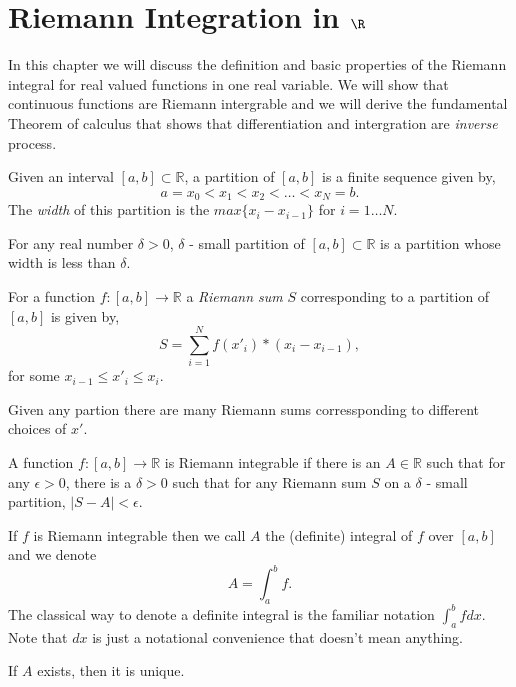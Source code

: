 \chapter{Riemann Integration in \texorpdfstring{$\R$}{}}
In this chapter we will discuss the definition and basic properties of the Riemann integral for real
valued functions in one real variable. We will show that continuous functions are Riemann
intergrable and we will derive the fundamental Theorem of calculus that shows that differentiation
and intergration are \emph{inverse} process.

\begin{Definition}
    Given an interval $\left[a,b\right] \subset \mathbb{R}$, a partition of $\left[a,b\right]$ is a
    finite sequence given by,
    \[ a = x_0 < x_1 < x_2 < \dots < x_N = b.\]
    The \emph{width} of this partition is the $max\lbrace x_i - x_{i-1}\rbrace$ for $i = 1 \dots N$.
\end{Definition}
\begin{Definition}
    For any real number $\delta > 0$, $\delta$ - small partition of $\left[a,b\right] \subset 
    \mathbb{R}$ is a partition whose width is less than $\delta$.
\end{Definition}
\begin{Definition}
    For a function $f : \left[a,b\right] \to \mathbb{R}$ a \emph{Riemann sum} $S$ corresponding to a
    partition of $\left[a,b\right]$ is given by,
    \[ S = \sum_{i = 1}^N f(x'{_i})*(x_i - x_{i-1}),\]
    for some $x_{i-1} \leq x'{_i} \leq x_i$.
\end{Definition}
Given any partion there are many Riemann sums corressponding to different choices of $x'$. 
\begin{Definition}
    A function $f : \left[a,b\right] \to \mathbb{R}$ is Riemann integrable if there is an $A \in
    \mathbb{R}$ such that for any $\epsilon > 0$, there is a $\delta > 0$ such that for any Riemann
    sum $S$ on a $\delta$ - small partition, $\lvert S - A \rvert < \epsilon$. 
\end{Definition}
If $f$ is Riemann integrable then we call $A$ the (definite) integral of $f$ over
$\left[a,b\right]$ and we denote \[ A = \int_{a}^{b} f. \] The classical way to denote a definite
integral is the familiar notation $\int_{a}^{b}fdx$. Note that $dx$ is just a notational convenience
that doesn't mean anything.
\begin{Proposition}
    If $A$ exists, then it is unique.
\end{Proposition}
